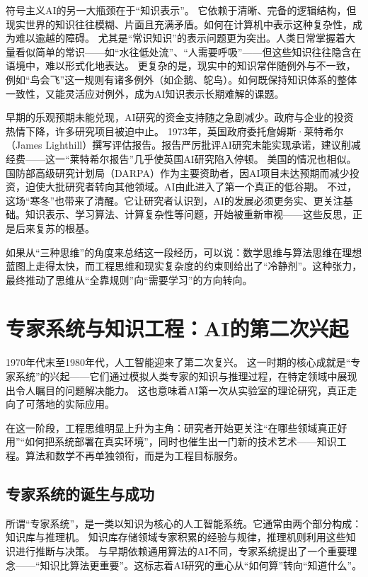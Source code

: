 符号主义AI的另一大瓶颈在于“知识表示”。  
它依赖于清晰、完备的逻辑结构，但现实世界的知识往往模糊、片面且充满矛盾。如何在计算机中表示这种复杂性，成为难以逾越的障碍。  
尤其是“常识知识”的表示问题更为突出。人类日常掌握着大量看似简单的常识——如“水往低处流”、“人需要呼吸”——但这些知识往往隐含在语境中，难以形式化地表达。  
更复杂的是，现实中的知识常伴随例外与不一致，例如“鸟会飞”这一规则有诸多例外（如企鹅、鸵鸟）。如何既保持知识体系的整体一致性，又能灵活应对例外，成为AI知识表示长期难解的课题。

早期的乐观预期未能兑现，AI研究的资金支持随之急剧减少。政府与企业的投资热情下降，许多研究项目被迫中止。  
1973年，英国政府委托詹姆斯·莱特希尔（James Lighthill）撰写评估报告。报告严厉批评AI研究未能实现承诺，建议削减经费——这一“莱特希尔报告”几乎使英国AI研究陷入停顿。  
美国的情况也相似。国防部高级研究计划局（DARPA）作为主要资助者，因AI项目未达预期而减少投资，迫使大批研究者转向其他领域。AI由此进入了第一个真正的低谷期。  
不过，这场“寒冬”也带来了清醒。它让研究者认识到，AI的发展必须更务实、更关注基础。知识表示、学习算法、计算复杂性等问题，开始被重新审视——这些反思，正是后来复苏的根基。

如果从“三种思维”的角度来总结这一段经历，可以说：数学思维与算法思维在理想蓝图上走得太快，而工程思维和现实复杂度的约束则给出了“冷静剂”。这种张力，最终推动了思维从“全靠规则”向“需要学习”的方向转向。

\section{专家系统与知识工程：AI的第二次兴起}

1970年代末至1980年代，人工智能迎来了第二次复兴。  
这一时期的核心成就是“专家系统”的兴起——它们通过模拟人类专家的知识与推理过程，在特定领域中展现出令人瞩目的问题解决能力。  
这也意味着AI第一次从实验室的理论研究，真正走向了可落地的实际应用。

在这一阶段，工程思维明显上升为主角：研究者开始更关注“在哪些领域真正好用”“如何把系统部署在真实环境”，同时也催生出一门新的技术艺术——知识工程。算法和数学不再单独领衔，而是为工程目标服务。

\subsection{专家系统的诞生与成功}

所谓“专家系统”，是一类以知识为核心的人工智能系统。它通常由两个部分构成：知识库与推理机。  
知识库存储领域专家积累的经验与规律，推理机则利用这些知识进行推断与决策。  
与早期依赖通用算法的AI不同，专家系统提出了一个重要理念——“知识比算法更重要”。这标志着AI研究的重心从“如何算”转向“知道什么”。

